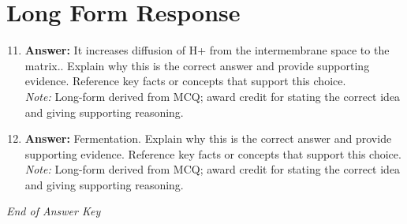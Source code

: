 \documentclass[12pt]{article}
\begin{document}
\section*{Long Form Response}
\begin{enumerate}[label=\arabic*.]
\setcounter{enumi}{10}
\item \textbf{Answer:} It increases diffusion of H+ from the intermembrane space to the matrix.. Explain why this is the correct answer and provide supporting evidence. Reference key facts or concepts that support this choice.
\\ \textit{Note:} Long-form derived from MCQ; award credit for stating the correct idea and giving supporting reasoning.
\item \textbf{Answer:} Fermentation. Explain why this is the correct answer and provide supporting evidence. Reference key facts or concepts that support this choice.
\\ \textit{Note:} Long-form derived from MCQ; award credit for stating the correct idea and giving supporting reasoning.
\end{enumerate}

\vfill
\noindent\textit{End of Answer Key}
\end{document}
